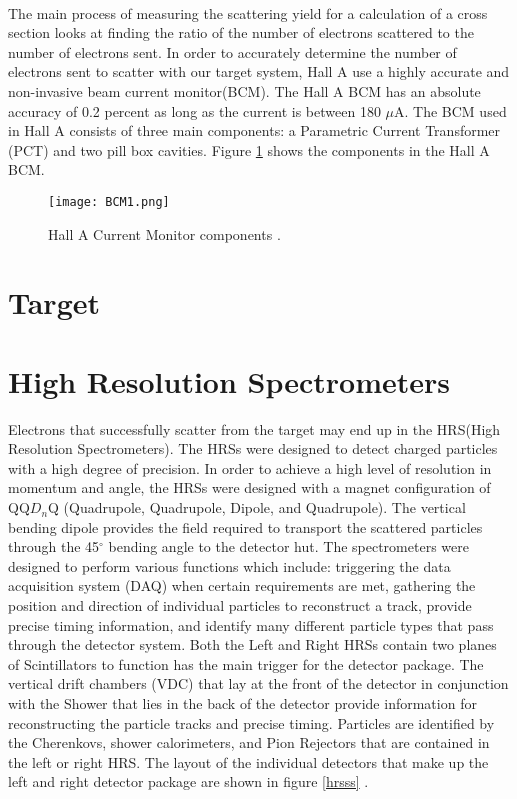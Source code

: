 	\paragraph{} The main process of measuring the scattering yield for a calculation of a cross section looks at finding the ratio of the number of electrons scattered to the number of electrons sent. In order to accurately determine the number of electrons sent to scatter with our target system, Hall A use a highly accurate and non-invasive beam current monitor(BCM). The Hall A BCM has an absolute accuracy of 0.2 percent as long as the current is between 180 $\mu$A. The BCM used in Hall A consists of three main components: a Parametric Current Transformer (PCT) and two pill box cavities. Figure \ref{BCMpng} shows the components in the Hall A BCM.   
	  
	  	\begin{figure}[H]
	  	 	 		\centering
	  	 	 		\caption{Hall A Current Monitor components \cite{BCM1}. }
	  	 	 		\label{BCMpng}
	  	 	 		\texttt{[image: BCM1.png]} 
	  	\end{figure} 

	\paragraph{}	
	  
\section{Target}

\section{High Resolution Spectrometers}
Electrons that successfully scatter from the target may end up in the HRS(High Resolution Spectrometers). The HRSs were designed to detect charged particles with a high degree of precision. In order to achieve a high level of resolution in momentum and angle, the HRSs were designed with a magnet configuration of QQ$D_n$Q (Quadrupole, Quadrupole, Dipole, and Quadrupole). The vertical bending dipole provides the field required to transport the scattered particles through the 45$^\circ$ bending angle to the detector hut. The spectrometers were designed to perform various functions which include: triggering the data acquisition system (DAQ) when certain requirements are met, gathering the position and direction of individual particles to reconstruct a track, provide precise timing information, and identify many different particle types that pass through the detector system. Both the Left and Right HRSs contain two planes of Scintillators to function has the main trigger for the detector package. The vertical drift chambers (VDC) that lay at the front of the detector in conjunction with the Shower that lies in the back of the detector provide information for reconstructing the particle tracks and precise timing. Particles are identified by the Cherenkovs, shower calorimeters, and Pion Rejectors that are contained in the left or right HRS. The layout of the individual detectors that make up the left and right detector package are shown in figure \ref{hrsss}  \cite{HallA}.

